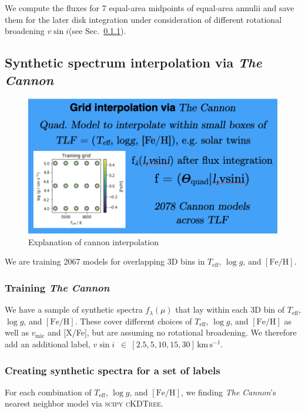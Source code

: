 \documentclass[
  journal=pasa,
  manuscript=research-paper, %
  year=2021,
  volume=37,
]{cup-journal}
\newcommand{\Teff}{$T_\mathrm{eff}$\xspace}
\newcommand{\logg}{$\log g$\xspace}
\newcommand{\feh}{$\mathrm{[Fe/H]}$\xspace}
\newcommand{\vmic}{$v_\mathrm{mic}$\xspace}
\newcommand{\vsini}{$v \sin i$\xspace}
\newcommand{\TheCannon}{\textit{The Cannon}\xspace}
\newcommand{\TLF}{\Teff, \logg, and \feh}
\newcommand{\kms}{\,\mathrm{km\,s^{-1}}}	%
\begin{document}
We compute the fluxes for 7 equal-area midpoints of equal-area annulii and save them for the later disk integration under consideration of different rotational broadening \vsini (see Sec.~\ref{sec:cannon_input}).

\subsection{Synthetic spectrum interpolation via \TheCannon}

\begin{figure}[hbt!]
 \centering
 \includegraphics[width=\columnwidth]{figures/cannon_interpolation.png}
 \caption{Explanation of cannon interpolation}
 \label{fig:cannon_interpolation}
\end{figure}

We are training 2067 models for overlapping 3D bins in \Teff, \logg, and \feh.

\subsubsection{Training \TheCannon} \label{sec:cannon_input}

We have a sample of synthetic spectra $f_\lambda (\mu)$ that lay within each 3D bin of \TLF. These cover different choices of \TLF as well as \vmic and [X/Fe], but are assuming no rotational broadening. We therefore add an additional label, \vsini~$\in~[2.5, 5, 10, 15, 30] \kms$.

\subsubsection{Creating synthetic spectra for a set of labels} \label{sec:cannon_synthesis}

For each combination of \TLF, we finding \TheCannon's nearest neighbor model via \textsc{scipy} \textsc{cKDTree}.
\end{document}

